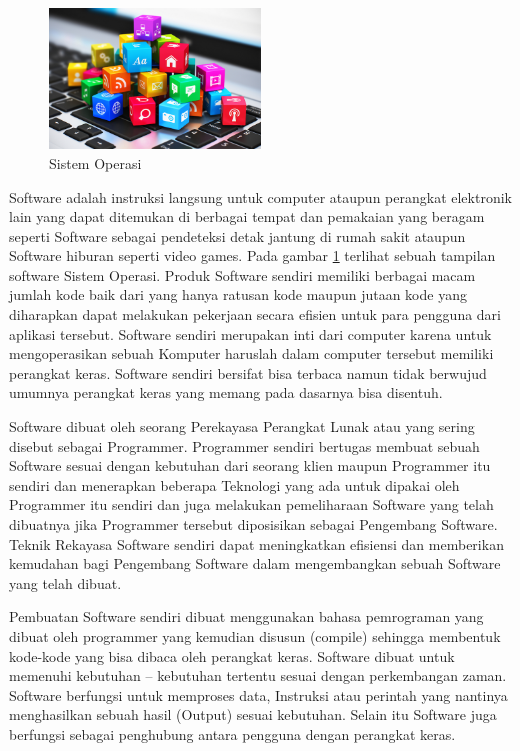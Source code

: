 \begin{figure}[ht]
\centerline{\includegraphics[width=0.5\textwidth]{figures/Abstraksi.jpg}}
\caption{Sistem Operasi}
\label{Abstraksi}
\end{figure}
\begin{flushleft}
Software adalah instruksi langsung untuk computer ataupun perangkat elektronik lain yang dapat ditemukan di berbagai tempat dan pemakaian yang beragam seperti Software sebagai pendeteksi detak jantung di rumah sakit ataupun Software hiburan seperti video games. Pada gambar \ref{Abstraksi} terlihat sebuah tampilan software Sistem Operasi. Produk Software sendiri memiliki berbagai macam jumlah kode baik dari yang hanya ratusan kode maupun jutaan kode yang diharapkan dapat melakukan pekerjaan secara efisien untuk para pengguna dari aplikasi tersebut. Software sendiri merupakan inti dari computer karena untuk mengoperasikan sebuah Komputer haruslah dalam computer tersebut memiliki perangkat keras. Software sendiri bersifat bisa terbaca namun tidak berwujud umumnya perangkat keras yang memang pada dasarnya bisa disentuh. 
\end{flushleft}
\begin{flushleft}
Software dibuat oleh seorang Perekayasa Perangkat Lunak  atau yang sering disebut sebagai Programmer. Programmer sendiri bertugas membuat sebuah Software sesuai dengan kebutuhan dari seorang klien maupun Programmer itu sendiri dan menerapkan beberapa Teknologi yang ada untuk dipakai oleh Programmer itu sendiri dan juga melakukan pemeliharaan Software yang telah dibuatnya jika Programmer tersebut diposisikan sebagai Pengembang Software. Teknik Rekayasa Software sendiri dapat meningkatkan efisiensi dan memberikan kemudahan bagi Pengembang Software dalam mengembangkan sebuah Software yang telah dibuat. 
\end{flushleft}
\begin{flushleft}
Pembuatan Software sendiri dibuat menggunakan bahasa pemrograman yang dibuat oleh programmer yang kemudian disusun (compile) sehingga membentuk kode-kode yang bisa dibaca oleh perangkat keras. Software dibuat untuk memenuhi kebutuhan – kebutuhan tertentu sesuai dengan perkembangan zaman. Software berfungsi untuk memproses data, Instruksi atau perintah yang nantinya menghasilkan sebuah hasil (Output) sesuai kebutuhan. Selain itu Software juga berfungsi sebagai penghubung antara pengguna dengan perangkat keras.
\end{flushleft}

